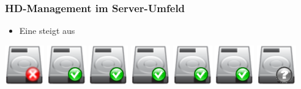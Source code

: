 \documentclass{beamer}
\begin{document}
  \frame
  {
    \frametitle{HD-Management im Server-Umfeld}

    \begin{itemize}
    \item{Eine steigt aus}
    \end{itemize}

    \resizebox{40pt}{40pt}
    {
      \includegraphics{img/hdd_big_critical.png}
    }
    \resizebox{40pt}{40pt}
    {
      \includegraphics{img/hdd_big_ok.png}
    }
    \resizebox{40pt}{40pt}
    {
      \includegraphics{img/hdd_big_ok.png}
    }
    \resizebox{40pt}{40pt}
    {
      \includegraphics{img/hdd_big_ok.png}
    }
    \resizebox{40pt}{40pt}
    {
      \includegraphics{img/hdd_big_ok.png}
    }
    \resizebox{40pt}{40pt}
    {
      \includegraphics{img/hdd_big_ok.png}
    }
    \resizebox{40pt}{40pt}
    {
      \includegraphics{img/hdd_big_unknown.png}
    }
  }
\end{document}
